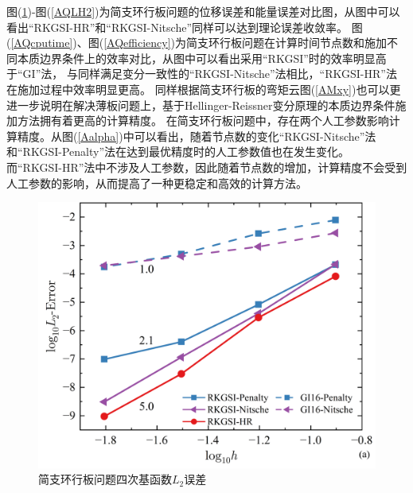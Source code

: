 图(\ref{AQLH1})-图(\ref{AQLH2})为简支环行板问题的位移误差和能量误差对比图，从图中可以看出“RKGSI-HR”和“RKGSI-Nitsche”同样可以达到理论误差收敛率。
图(\ref{AQcputime})、图(\ref{AQefficiency})为简支环行板问题在计算时间节点数和施加不同本质边界条件上的效率对比，从图中可以看出采用“RKGSI”时的效率明显高于“GI”法，
与同样满足变分一致性的“RKGSI-Nitsche”法相比，“RKGSI-HR”法在施加过程中效率明显更高。
同样根据简支环行板的弯矩云图(\ref{AMxy})也可以更进一步说明在解决薄板问题上，基于Hellinger-Reissner变分原理的本质边界条件施加方法拥有着更高的计算精度。
在简支环行板问题中，存在两个人工参数影响计算精度。从图(\ref{Aalpha})中可以看出，随着节点数的变化“RKGSI-Nitsche”法和“RKGSI-Penalty”法在达到最优精度时的人工参数值也在发生变化。
而“RKGSI-HR”法中不涉及人工参数，因此随着节点数的增加，计算精度不会受到人工参数的影响，从而提高了一种更稳定和高效的计算方法。
\begin{figure}[H]
    \centering
    \includegraphics[scale=0.5]{figure/PHR/A/QL2.png}
    \caption{简支环行板问题四次基函数$L_2$误差}\label{AQLH1}
\end{figure}
